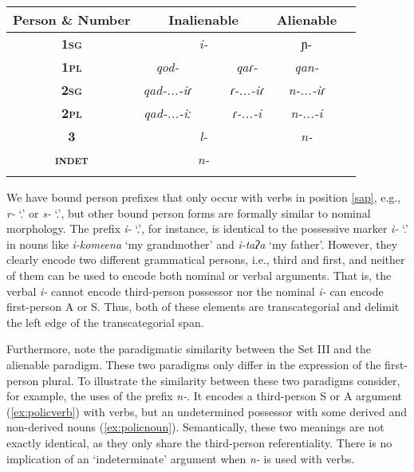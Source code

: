 \documentclass[output=paper]{langscibook}
\begin{document}
\begin{table}
\label{tab:NCMpossessiveparadigms}
\begin{tabular}{ccccccc} 
\lsptoprule
\textbf{Person \& Number}& \multicolumn{4}{c}{\textbf{Inalienable}} & \textbf{Alienable} &\\\midrule
\textsc{\textbf{1sg}}	&	 \multicolumn{4}{c}{\textit{i-}}	&	ɲ- &\\
\textsc{\textbf{1pl}}	&\textit{	qod-} &			&	&		\textit{qaɾ- }		& \textit{qan-} &\\
\textsc{\textbf{2sg}}	&	\textit{qad-...-iɾ}& 	&& 	\textit{ɾ-...-iɾ}		&	 \textit{n-...-iɾ	} &\\
\textsc{\textbf{2pl}} 	& \textit{qad-...-iː} 	& & & 	\textit{ɾ-...-i}		&	\textit{n-...-i} &\\
\textsc{\textbf{3}}		&	\multicolumn{4}{c}{\textit{l-}}	&\textit{ n-} &\\
\textsc{\textbf{indet}} & \multicolumn{4}{c}{\textit{n-}}&  &\\	
\lspbottomrule
\end{tabular}
\end{table}

 We have bound person prefixes that only occur with verbs in position \ref{sap}, e.g., \textit{r-} `\Third.\Intr' or \textit{s-} `\First.\II', but other bound person forms are formally similar to nominal morphology. The prefix \textit{i-} `\Third.\II', for instance, is identical to the possessive marker \textit{i-} `\First\Sg.\Poss' in nouns like \textit{i-komeena} `my grandmother' and \textit{i-taʔa} `my father'. However, they clearly encode two different grammatical persons, i.e., third and first, and neither of them can be used to encode both nominal or verbal arguments. That is, the verbal \textit{i-} cannot encode third-person possessor nor the nominal \textit{i-} can encode first-person A or S. Thus, both of these elements are transcategorial and delimit the left edge of the transcategorial span.


Furthermore, note the paradigmatic similarity between the Set III and the alienable paradigm. These two paradigms only differ in the expression of the first-person plural. To illustrate the similarity between these two paradigms consider, for example, the uses of the prefix \textit{n-}. It encodes a third-person S or A argument (\ref{ex:policverb}) with verbs, but an undetermined possessor with some derived and non-derived nouns (\ref{ex:policnoun}). Semantically, these two meanings are not exactly identical, as they only share the third-person referentiality. There is no implication of an `indeterminate' argument when \textit{n-} is used with verbs. 
\end{document}
